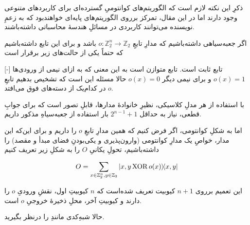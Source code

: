 \documentclass[a4paper,12pt]{article}
\DeclareMathOperator{\XOR}{XOR}
\begin{document}

ذکرِ این نکته لازم است که الگوریتم‌های کوانتومیِ گسترده‌ای برای کاربردهای متنوعی وجود دارند
 اما در این مقال، تمرکز برروی الگوریتم‌های پایه‌ای خواهندبود که به زعمِ نویسنده می‌توانند کاربردی در مسائلِ هندسهٔ محاسباتی داشته‌باشند.



اگر جعبه‌سیاهی
 داشته‌باشیم که مدارِ تابعِ 
\( o : \mathbb{Z}_2^n \to \mathbb{Z}_2 \)
باشد و برای این تابع داشته‌باشیم که حتماً یکی از حالت‌های زیر برقرار است

[-]
 تابع ثابت است.
 تابع متوازن است به این معنی که به ازای نیمی از ورودی‌ها 
\( o(x) = 1 \)
و برای نیمی دیگر
\( o(x) = 0 \)
حالا مسئله این است که تشخیص بدهیم تابعِ \(o\) در کدام‌یک از دسته‌های فوق می‌افتد.

با استفاده از هر مدلِ  کلاسیکی، نظیرِ خانوادهٔ مدارها، قابلِ تصور است که برای جوابِ قطعی، نیاز به حداقل
\(2^{n-1}+1\)
بار استفاده از جعبه‌سیاهِ مذکور داریم.

اما به شکلِ کوانتومی، اگر فرض کنیم که همین مدارِ تابعِ \(o\) را داریم و برای این‌که این مدار، خواصِ یک مدارِ کوانتومی (وارون‌پذیری و یکی‌بودنِ فضای مبدأ و مقصد) را داشته‌باشیم، تحولِ یکانیِ \(O\) را به شکلِ زیر تعریف کنیم

\begin{equation}
    O = \sum_{x \in \mathbb{Z}_2^n, y \in \mathbb{Z}_2} \dyad{x, y \XOR o(x)}{x, y}
\end{equation} 

این تعمیم برروی \(n+1\) کیوبیت تعریف شده‌است که \(n\) کیوبیتِ اول، نقشِ ورودیِ \(o\) را دارند و کیوبیتِ آخر، محلِ ذخیرهٔ خروجیِ \(o\) است.

حالا شبهِ‌کدی مانندِ  را درنظر بگیرید.
\end{document}
